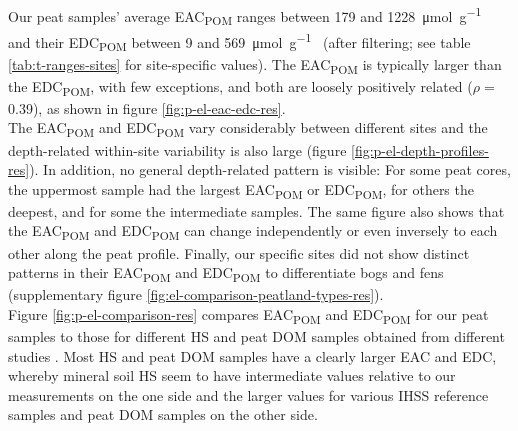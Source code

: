 \documentclass[alpha-refs, lineno]{wiley-article-rmd}
\begin{document}
Our peat samples' average EAC\textsubscript{POM} ranges between 179 and \SI{1228}{\micro\mol\per\g\carbon} and their EDC\textsubscript{POM} between 9 and \SI{569}{\micro\mol\per\g\carbon} (after filtering; see table \ref{tab:t-ranges-sites} for site-specific values). The EAC\textsubscript{POM} is typically larger than the EDC\textsubscript{POM}, with few exceptions, and both are loosely positively related (\(\rho=\) 0.39), as shown in figure \ref{fig:p-el-eac-edc-res}.\\
The EAC\textsubscript{POM} and EDC\textsubscript{POM} vary considerably between different sites and the depth-related within-site variability is also large (figure \ref{fig:p-el-depth-profiles-res}). In addition, no general depth-related pattern is visible: For some peat cores, the uppermost sample had the largest EAC\textsubscript{POM} or EDC\textsubscript{POM}, for others the deepest, and for some the intermediate samples. The same figure also shows that the EAC\textsubscript{POM} and EDC\textsubscript{POM} can change independently or even inversely to each other along the peat profile. Finally, our specific sites did not show distinct patterns in their EAC\textsubscript{POM} and EDC\textsubscript{POM} to differentiate bogs and fens (supplementary figure \ref{fig:el-comparison-peatland-types-res}).\\
Figure \ref{fig:p-el-comparison-res} compares EAC\textsubscript{POM} and EDC\textsubscript{POM} for our peat samples to those for different HS and peat DOM samples obtained from different studies \autocite{Aeschbacher.2012,Tan.2017,Walpen.2018}. Most HS and peat DOM samples have a clearly larger EAC and EDC, whereby mineral soil HS \autocite{Tan.2017} seem to have intermediate values relative to our measurements on the one side and the larger values for various IHSS reference samples \autocite{Aeschbacher.2012} and peat DOM samples \autocite{Walpen.2018} on the other side.
\end{document}

